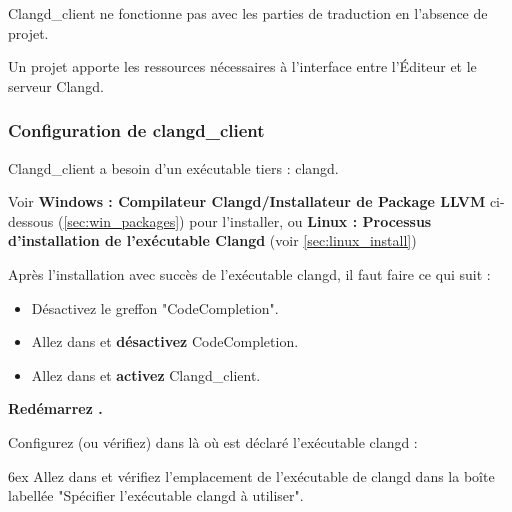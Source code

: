 Clangd\_client ne fonctionne pas avec les parties de traduction en l'absence de projet.
							 
Un projet apporte les ressources nécessaires à l'interface entre l'Éditeur et le serveur Clangd.

\subsubsection{Configuration de clangd\_client}\label{sec:cfg_client}

Clangd\_client a besoin d'un exécutable tiers : clangd.

Voir \textbf{Windows : Compilateur Clangd/Installateur de Package LLVM} ci-dessous (\ref{sec:win_packages}) pour l'installer, ou \textbf{Linux : Processus d'installation de l'exécutable Clangd} (voir \ref{sec:linux_install})

Après l'installation avec succès de l'exécutable clangd, il faut faire ce qui suit :

\begin{itemize}[noitemsep]
\item Désactivez le greffon "CodeCompletion".
\item Allez dans  et \textbf{désactivez} CodeCompletion.
\item Allez dans  et \textbf{activez} Clangd\_client.
\end{itemize}
\textbf{Redémarrez \codeblocks.}

Configurez (ou vérifiez) dans \codeblocks là où est déclaré l'exécutable clangd :\par
\begingroup
\leftskip 6ex
Allez dans  et vérifiez l'emplacement de l'exécutable de clangd dans la boîte labellée "Spécifier l'exécutable clangd à utiliser".
\par
\endgroup

